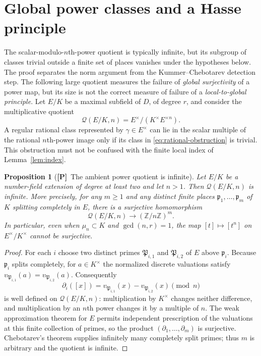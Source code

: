 \documentclass[11pt]{article}
\newcommand{\Ptag}{\textnormal{\textbf{[P]}}}
\theoremstyle{plain}
\newtheorem{proposition}[theorem]{Proposition}
\theoremstyle{definition}
\begin{document}
\section{Global power classes and a Hasse principle}\label{sec:global-power}
The scalar-modulo-$n$th-power quotient is typically infinite,
but its subgroup of classes trivial outside a finite set of places
vanishes under the hypotheses below. The proof separates the
norm argument from the Kummer--Chebotarev detection step.
The following large quotient measures the failure of \emph{global
surjectivity} of a power map, but its size is not the correct measure
of failure of a \emph{local-to-global principle}. Let $E/K$ be a maximal subfield
of $D$, of degree $r$, and consider the multiplicative quotient
\begin{equation}\label{eq:rational-obstruction}
\mathcal Q(E/K,n)=E^\times/(K^\times E^{\times n}).
\end{equation}
A regular rational class represented by $\gamma\in E^\times$
can lie in the scalar multiple of the rational $n$th-power image
only if its class in \eqref{eq:rational-obstruction} is trivial.
This obstruction must not be confused with the finite local index
of Lemma~\ref{lem:index}.

\begin{proposition}[\Ptag\ The ambient power quotient is infinite]
\label{prop:global-cokernel}
Let $E/K$ be a number-field extension of degree at least two and
let $n>1$. Then $\mathcal Q(E/K,n)$ is infinite. More precisely,
for any $m\geq 1$ and any distinct finite places
$\mathfrak p_1,\dots,\mathfrak p_m$ of $K$ splitting completely in
$E$, there is a surjective homomorphism
\[
\mathcal Q(E/K,n)\longrightarrow (\mathbb Z/n\mathbb Z)^m.
\]
In particular, even when $\mu_n\subset K$ and $\gcd(n,r)=1$,
the map $[t]\mapsto[t^n]$ on $E^\times/K^\times$ cannot be
surjective.
\end{proposition}
\begin{proof}
For each $i$ choose two distinct primes
$\mathfrak P_{i,1}$ and $\mathfrak P_{i,2}$ of $E$ above
$\mathfrak p_i$. Because $\mathfrak p_i$ splits completely,
for $a\in K^\times$ the normalized discrete valuations satisfy
$v_{\mathfrak P_{i,1}}(a)=v_{\mathfrak P_{i,2}}(a)$.
Consequently
\[
\partial_i([x])=
 v_{\mathfrak P_{i,1}}(x)-v_{\mathfrak P_{i,2}}(x)
 \pmod n
\]
is well defined on $\mathcal Q(E/K,n)$: multiplication by
$K^\times$ changes neither difference, and multiplication by
an $n$th power changes it by a multiple of $n$.
The weak approximation theorem for $E$ permits independent
prescription of the valuations at this finite collection of primes,
so the product $(\partial_1,\dots,\partial_m)$ is surjective.
Chebotarev's theorem supplies infinitely many completely split
primes; thus $m$ is arbitrary and the quotient is infinite.
\end{proof}
\end{document}
